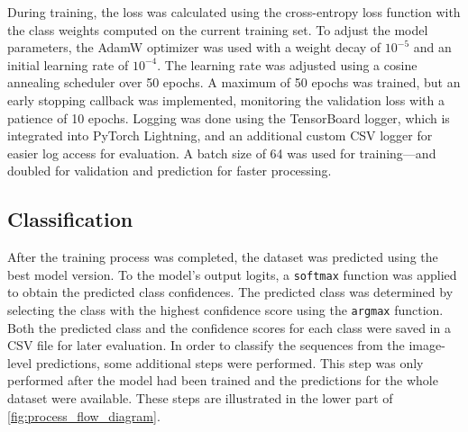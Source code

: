     During training, the loss was calculated using the cross-entropy loss function with the class weights computed on the current training set.
    To adjust the model parameters, the AdamW optimizer \autocite{loshchilovDecoupledWeightDecay2019} was used with a weight decay of \(10^{-5}\) and an initial learning rate of \(10^{-4}\).
    The learning rate was adjusted using a cosine annealing scheduler \autocite{loshchilovSGDRStochasticGradient2017} over 50 epochs.
    A maximum of 50 epochs was trained, but an early stopping callback was implemented, monitoring the validation loss with a patience of 10 epochs.
    Logging was done using the TensorBoard logger, which is integrated into PyTorch Lightning, and an additional custom \ac{CSV} logger for easier log access for evaluation.
    A batch size of 64 was used for training---and doubled for validation and prediction for faster processing.

    \subsection{Classification}
    After the training process was completed, the dataset was predicted using the best model version.
    To the model's output logits, a \texttt{softmax} function was applied to obtain the predicted class confidences.
    The predicted class was determined by selecting the class with the highest confidence score using the \texttt{argmax} function.
    Both the predicted class and the confidence scores for each class were saved in a \ac{CSV} file for later evaluation.
    In order to classify the sequences from the image-level predictions, some additional steps were performed.
    This step was only performed after the model had been trained and the predictions for the whole dataset were available.
    These steps are illustrated in the lower part of \autoref{fig:process_flow_diagram}.

